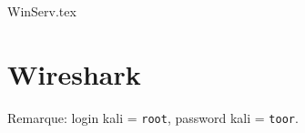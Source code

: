 \documentclass[a4paper]{article}
\renewcommand{\tt}{\texttt}
\begin{document}
{WinServ.tex}















\section{Wireshark}





\begin{example}
    Remarque: login kali = \tt{root}, password kali = \tt{toor}.
\end{example}
\end{document}
